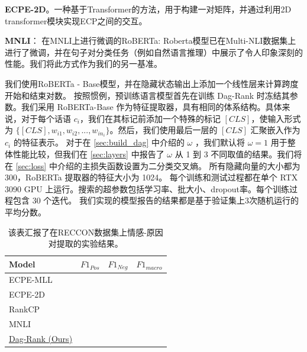 \textbf{ECPE-2D}。一种基于Transformer的方法\cite{DBLP:conf/acl/DingXY20}，用于构建一对矩阵，并通过利用2D transformer模块实现ECP之间的交互。

\textbf{MNLI}： 在MNLI上进行微调的RoBERTa: Roberta模型已在Multi-NLI数据集\cite{kim2019semantic}上进行了微调，并在句子对分类任务（例如自然语言推理）中展示了令人印象深刻的性能。我们将此方式作为我们的另一基准。


我们使用RoBERTa - Base模型，并在隐藏状态输出上添加一个线性层来计算跨度开始和结束对数。
按照惯例，预训练语言模型首先在训练 Dag-Rank 时冻结其参数。我们采用 RoBERTa-Base \cite{liu2019roberta} 作为特征提取器，具有相同的体系结构。具体来说，对于每个话语 $c_i$，我们在其标记前添加一个特殊的标记   $[CLS]$，使输入形式为 $\{[CLS],w_{i1}, w_{i2},...,w_{in_i}\}$。然后，我们使用最后一层的 $[CLS]$ 汇聚嵌入作为 $c_i$ 的特征表示。
对于在 \ref{sec:build_dag} 中介绍的 $\omega$ ，我们默认将 $\omega=1$ 用于整体性能比较，但我们在 \ref{sec:layers} 中报告了  $\omega$ 从 1 到 3 不同取值的结果。我们将在 \ref{sec:loss} 中介绍的主损失函数设置为二分类交叉熵。
所有隐藏向量的大小都为 300，RoBERTa 提取器的特征大小为 1024。
每个训练和测试过程都在单个 RTX 3090 GPU 上运行。搜索的超参数包括学习率、批大小、dropout率。每个训练过程包含 30 个迭代。 我们实现的模型报告的结果都是基于验证集上$3$次随机运行的平均分数。




\begin{table}[t]
\vspace{15pt}
\renewcommand{\arraystretch}{1.2}
\centering\wuhao
\caption{该表汇报了在RECCON数据集上情感-原因对提取的实验结果。}
     \vspace{3mm}
 {
 \begin{tabularx}{\textwidth} { 
   >{\centering\arraybackslash}X 
   >{\centering\arraybackslash}X
   >{\centering\arraybackslash}X
   >{\centering\arraybackslash}X }

    \toprule[1.5pt]
      \textbf{Model} & $F1_{Pos}$ & $F1_{Neg}$ & $F1_{macro}$ \\
    \midrule[1pt]
   ECPE-MLL    &  &  &   \\
    ECPE-2D   &  &  &   \\
    RankCP    &  &  &   \\
    MNLI   &  &  &  \\
    \underline{Dag-Rank (Ours)}   &  &  &   \\
    \bottomrule
   \end{tabularx}}

  \label{tab:res}
  \vspace{10pt}
\end{table}


